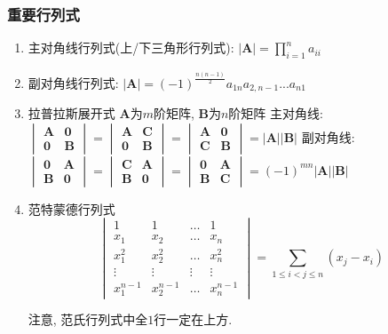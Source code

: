 \subsubsection{重要行列式}
\begin{enumerate}
\item 主对角线行列式(上/下三角形行列式): $ |\bm{A}|=\prod_{i=1}^{n}a_{ii} $
\item 副对角线行列式: $ |\bm{A}|=(-1)^{\frac{n(n-1)}{2}}a_{1n}a_{2,n-1}...a_{n1} $
\item 拉普拉斯展开式
\subitem $ \bm{A} $为$ m $阶矩阵, $ \bm{B} $为$ n $阶矩阵
\subitem 主对角线:
$ \begin{vmatrix}
  \bm{A} & \bm{0} \\
  \bm{0} & \bm{B}
\end{vmatrix} = \begin{vmatrix}
                \bm{A} & \bm{C} \\
                \bm{0} & \bm{B}
\end{vmatrix} = \begin{vmatrix}
                \bm{A} & \bm{0} \\
                \bm{C} & \bm{B}
\end{vmatrix} = |\bm{A}||\bm{B}|$
\subitem 副对角线:
$ \begin{vmatrix}
  \bm{0} & \bm{A} \\
  \bm{B} & \bm{0}
\end{vmatrix} = \begin{vmatrix}
                \bm{C} & \bm{A} \\
                \bm{B} & \bm{0}
\end{vmatrix} = \begin{vmatrix}
                \bm{0} & \bm{A} \\
                \bm{B} & \bm{C}
\end{vmatrix} = (-1)^{mn}|\bm{A}||\bm{B}|$
\item 范特蒙德行列式
\begin{equation*}
\begin{vmatrix}
1 & 1 & \dots & 1 \\
x_1 & x_2 & \dots & x_n \\
x_1^2 & x_2^2 & \dots & x_n^2 \\
\vdots & \vdots  & \vdots & \vdots \\
x_{1}^{n-1} & x_{2}^{n-1} & \dots & x_{n}^{n-1}
\end{vmatrix} = \sum_{1\le i<j\le n}(x_{j}-x_{i})
\end{equation*}\par
注意, 范氏行列式中全$1$行一定在上方.
\end{enumerate}
